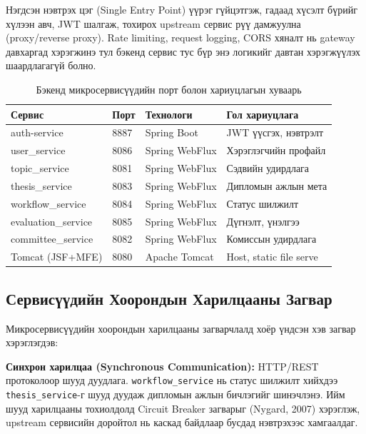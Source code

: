 Нэгдсэн нэвтрэх цэг (Single Entry Point) үүрэг гүйцэтгэж, гадаад
хүсэлт бүрийг хүлээн авч, JWT шалгаж, тохирох upstream сервис рүү
дамжуулна (proxy/reverse proxy). Rate limiting, request logging,
CORS хяналт нь gateway давхаргад хэрэгжинэ тул бэкенд сервис тус
бүр энэ логикийг давтан хэрэгжүүлэх шаардлагагүй болно.

\begin{table}[H]
    \centering
    \caption{Бэкенд микросервисүүдийн порт болон хариуцлагын хуваарь}
    \label{tab:service_ports}
    \renewcommand{\arraystretch}{0.7}
    \begin{tabular}{llll}
        \toprule
        \textbf{Сервис} & \textbf{Порт} & \textbf{Технологи} & \textbf{Гол хариуцлага} \\
        \midrule
        auth-service         & 8887 & Spring Boot  & JWT үүсгэх, нэвтрэлт \\
        user\_service        & 8086 & Spring WebFlux & Хэрэглэгчийн профайл \\
        topic\_service       & 8081 & Spring WebFlux & Сэдвийн удирдлага \\
        thesis\_service      & 8083 & Spring WebFlux & Дипломын ажлын мета \\
        workflow\_service    & 8084 & Spring WebFlux & Статус шилжилт \\
        evaluation\_service  & 8085 & Spring WebFlux & Дүгнэлт, үнэлгээ \\
        committee\_service   & 8082 & Spring WebFlux & Комиссын удирдлага \\
        Tomcat (JSF+MFE)     & 8080 & Apache Tomcat  & Host, static file serve \\
        \bottomrule
    \end{tabular}
\end{table}

\subsection{Сервисүүдийн Хоорондын Харилцааны Загвар}

Микросервисүүдийн хоорондын харилцааны загварчлалд хоёр үндсэн хэв
загвар хэрэглэгдэв:

\textbf{Синхрон харилцаа (Synchronous Communication):} HTTP/REST
протоколоор шууд дуудлага. \texttt{workflow\_service} нь статус
шилжилт хийхдээ \texttt{thesis\_service}-г шууд дуудаж дипломын
ажлын бичлэгийг шинэчлэнэ. Ийм шууд харилцааны тохиолдолд Circuit
Breaker загварыг (Nygard, 2007) хэрэглэж, upstream сервисийн
доройтол нь каскад байдлаар бусдад нэвтрэхээс хамгаалдаг.

